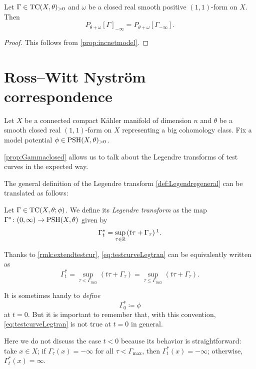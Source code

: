 \begin{proposition}\label{prop:PpreGammainf}
    Let $\Gamma\in \mathrm{TC}(X,\theta)_{>0}$ and $\omega$ be a closed real smooth positive $(1,1)$-form on $X$. Then
    \[
    P_{\theta+\omega}[\Gamma]_{-\infty}=P_{\theta+\omega}[\Gamma_{-\infty}].
    \]
\end{proposition}
\begin{proof}
     This follows from \cref{prop:incnetmodel}.
\end{proof}

\section{Ross--Witt Nystr\"om correspondence}\label{sec:RWN}
Let $X$ be a connected compact K\"ahler manifold of dimension $n$ and $\theta$ be a smooth closed real $(1,1)$-form on $X$ representing a big cohomology class.
Fix a model potential $\phi\in \mathrm{PSH}(X,\theta)_{>0}$.

\cref{prop:Gammaclosed} allows us to talk about the Legendre transforms of test curves in the expected way.

The general definition of the Legendre transform \cref{def:Legendregeneral} can be translated as follows:
\begin{definition}\label{def:Legtrans}
    Let $\Gamma\in \mathrm{TC}(X,\theta;\phi)$. We define its \emph{Legendre transform} as the map $\Gamma^*\colon (0,\infty)\rightarrow \mathrm{PSH}(X,\theta)$ given by
    \begin{equation}\label{eq:testcurveLegtran}
        \Gamma^*_t=\sup_{\tau\in \mathbb{R}} \left(t\tau+ \Gamma_{\tau}\right)\footnotemark.
    \end{equation}
\end{definition}
Thanks to \cref{rmk:extendtestcur}, \eqref{eq:testcurveLegtran} can be equivalently written as
\[
\Gamma^*_t=\sup_{\tau<\Gamma_{\max}} \left(t\tau+ \Gamma_{\tau}\right)=\sup_{\tau\leq \Gamma_{\max}} \left(t\tau+ \Gamma_{\tau}\right).
\]


It is sometimes handy to \emph{define}
\begin{equation}\label{eq:Gamma0star}
\Gamma^*_0\coloneqq \phi
\end{equation}
at $t=0$. But it is important to remember that, with this convention, \eqref{eq:testcurveLegtran} is not true at $t=0$ in general.

\begin{remark}\label{rmk:negativeray}
Here we do not discuss the case $t<0$ because its behavior is straightforward: take $x\in X$; if $\Gamma_{\tau}(x)=-\infty$ for all $\tau<\Gamma_{\max}$, then $\Gamma_t^*(x)=-\infty$; otherwise, $\Gamma_t^*(x)=\infty$.
\end{remark}

